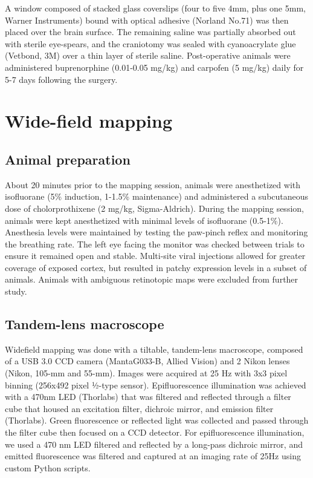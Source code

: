 A window composed of stacked glass coverslips (four to five 4mm, plus one 5mm, Warner Instruments) bound with optical adhesive (Norland No.71) was then placed over the brain surface. The remaining saline was partially absorbed out with sterile eye-spears, and the craniotomy was sealed with cyanoacrylate glue (Vetbond, 3M) over a thin layer of sterile saline. Post-operative animals were administered buprenorphine (0.01-0.05 mg/kg) and carpofen (5 mg/kg) daily for 5-7 days following the surgery.



\section{Wide-field mapping}
\subsection{Animal preparation}
About 20 minutes prior to the mapping session, animals were anesthetized with isofluorane (5\% induction, 1-1.5\% maintenance) and administered a subcutaneous dose of cholorprothixene (2 mg/kg, Sigma-Aldrich). During the mapping session, animals were kept anesthetized with minimal levels of isofluorane (0.5-1\%). Anesthesia levels were maintained by testing the paw-pinch reflex and monitoring the breathing rate. The left eye facing the monitor was checked between trials to ensure it remained open and stable. Multi-site viral injections allowed for greater coverage of exposed cortex, but resulted in patchy expression levels in a subset of animals. Animals with ambiguous retinotopic maps were excluded from further study.

\subsection{Tandem-lens macroscope}
Widefield mapping was done with a tiltable, tandem-lens macroscope\cite{Ratzlaff1991, Kalatsky2003}, composed of a USB 3.0 CCD camera (MantaG033-B, Allied Vision) and 2 Nikon lenses (Nikon, 105-mm and 55-mm). Images were acquired at 25 Hz with 3x3 pixel binning (256x492 pixel ½-type sensor). Epifluorescence illumination was achieved with a 470nm LED (Thorlabs) that was filtered and reflected through a filter cube that housed an excitation filter, dichroic mirror, and emission filter (Thorlabs). Green fluorescence or reflected light was collected and passed through the filter cube then focused on a CCD detector. For epifluorescence illumination, we used a 470 nm LED filtered and reflected by a long-pass dichroic mirror, and emitted fluorescence was filtered and captured at an imaging rate of 25Hz using custom Python scripts.

